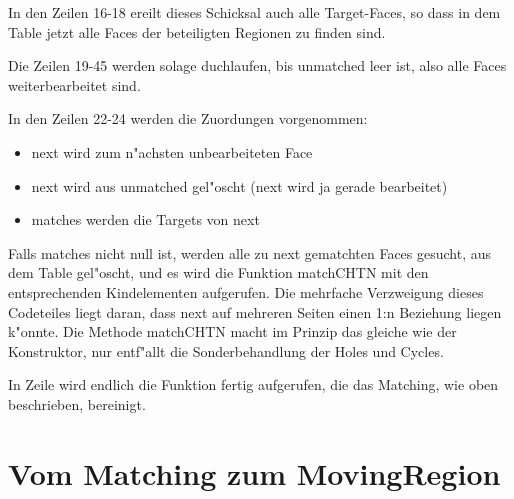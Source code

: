 \documentclass[a4paper,10pt,twoside]{scrreprt}
\begin{document}
In den Zeilen 16-18 ereilt dieses Schicksal auch alle Target-Faces, so dass in dem Table jetzt alle Faces der beteiligten Regionen zu finden sind.

Die Zeilen 19-45 werden solage duchlaufen, bis unmatched leer ist, also alle Faces weiterbearbeitet sind.

In den Zeilen 22-24 werden die Zuordungen vorgenommen:
\begin{itemize}
\item next wird zum n"achsten unbearbeiteten Face
\item next wird aus unmatched gel"oscht (next wird ja gerade bearbeitet)
\item matches werden die Targets von next

\end{itemize} 
Falls matches nicht null ist, werden alle zu next gematchten Faces gesucht, aus dem Table gel"oscht, und es wird die Funktion matchCHTN mit den entsprechenden Kindelementen aufgerufen. Die mehrfache Verzweigung dieses Codeteiles liegt daran, dass next auf mehreren Seiten einen 1:n Beziehung liegen k"onnte. Die Methode matchCHTN macht im Prinzip das gleiche wie der Konstruktor, nur entf"allt die Sonderbehandlung der Holes und Cycles.

In Zeile wird endlich die Funktion fertig aufgerufen, die das Matching, wie oben beschrieben, bereinigt.

\chapter{Vom Matching zum MovingRegion}

\printindex

\nocite{KOP}
\nocite{AAR}
\nocite{Sch}
\nocite{AHS}
\nocite{BW}
\nocite{Doe1}
\nocite{Doe1a}
\nocite{Doe2}
\nocite{Schi}
\nocite{Ber}
\nocite{Lei}
\nocite{Gru}
\nocite{AFRW}



\end{document}
